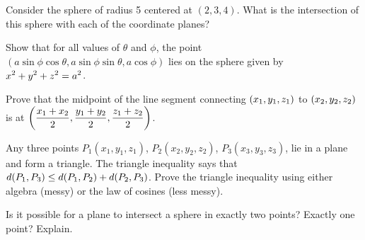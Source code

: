 \exercise Consider the sphere of radius 5 centered at $(2,3,4)$.  What is
the intersection of this sphere with each of the coordinate planes?
\endexercise

\exercise Show that for all values of $\theta$ and $\phi$, the point
$(a\sin\phi\cos\theta,a\sin\phi\sin\theta,a\cos\phi)$ lies on the
sphere given by $\displaystyle x^2+y^2+z^2=a^2$.
\endexercise

\exercise Prove that the midpoint of the line segment connecting
$\displaystyle (x_1,y_1,z_1)$ to $\displaystyle (x_2,y_2,z_2)$ is at 
$\displaystyle\left({x_1+x_2\over 2},{y_1+y_2\over 2},{z_1+z_2\over 2}\right)$.
\endexercise

\exercise Any three points $P_1(x_1,y_1,z_1)$, $P_2(x_2,y_2,z_2)$,
$P_3(x_3,y_3,z_3)$, lie in a plane and form a triangle.  The {\dfont
triangle inequality\/} says that $\displaystyle
d(P_1,P_3)\le d(P_1,P_2)+d(P_2,P_3)$.  Prove the triangle inequality
using either algebra (messy) or the law of cosines (less messy).
\endexercise

\exercise Is it possible for a plane to intersect a sphere in exactly two
points?  Exactly one point? Explain.  
\endexercise

\endexercises
